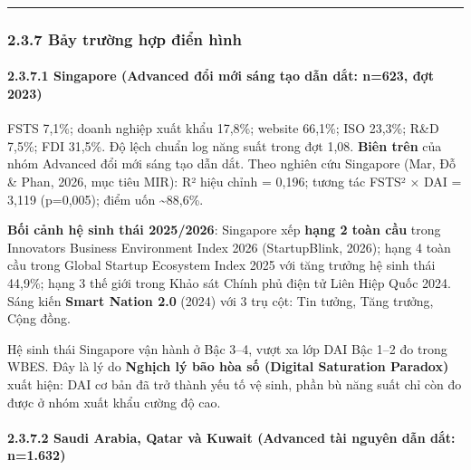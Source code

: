 \documentclass[
  a4paper,
  13pt]{extreport}
\begin{document}
\begin{center}\rule{0.5\linewidth}{0.5pt}\end{center}

\hypertarget{bux1ea3y-trux1b0ux1eddng-hux1ee3p-ux111iux1ec3n-huxecnh}{%
\subsubsection{2.3.7 Bảy trường hợp điển
hình}\label{bux1ea3y-trux1b0ux1eddng-hux1ee3p-ux111iux1ec3n-huxecnh}}

\hypertarget{singapore-advanced-ux111ux1ed5i-mux1edbi-suxe1ng-tux1ea1o-dux1eabn-dux1eaft-n623-ux111ux1ee3t-2023}{%
\paragraph{2.3.7.1 Singapore (Advanced đổi mới sáng tạo dẫn dắt: n=623,
đợt
2023)}\label{singapore-advanced-ux111ux1ed5i-mux1edbi-suxe1ng-tux1ea1o-dux1eabn-dux1eaft-n623-ux111ux1ee3t-2023}}

FSTS 7,1\%; doanh nghiệp xuất khẩu 17,8\%; website 66,1\%; ISO 23,3\%;
R\&D 7,5\%; FDI 31,5\%. Độ lệch chuẩn log năng suất trong đợt 1,08.
\textbf{Biên trên} của nhóm Advanced đổi mới sáng tạo dẫn dắt. Theo
nghiên cứu Singapore (Mar, Đỗ \& Phan, 2026, mục tiêu MIR): R² hiệu
chỉnh = 0,196; tương tác FSTS² × DAI = 3,119 (p=0,005); điểm uốn
\textasciitilde88,6\%.

\textbf{Bối cảnh hệ sinh thái 2025/2026}: Singapore xếp \textbf{hạng 2
toàn cầu} trong Innovators Business Environment Index 2026
(StartupBlink, 2026); hạng 4 toàn cầu trong Global Startup Ecosystem
Index 2025 với tăng trưởng hệ sinh thái 44,9\%; hạng 3 thế giới trong
Khảo sát Chính phủ điện tử Liên Hiệp Quốc 2024. Sáng kiến \textbf{Smart
Nation 2.0} (2024) với 3 trụ cột: Tin tưởng, Tăng trưởng, Cộng đồng.

Hệ sinh thái Singapore vận hành ở Bậc 3--4, vượt xa lớp DAI Bậc 1--2 đo
trong WBES. Đây là lý do \textbf{Nghịch lý bão hòa số (Digital
Saturation Paradox)} xuất hiện: DAI cơ bản đã trở thành yếu tố vệ sinh,
phần bù năng suất chỉ còn đo được ở nhóm xuất khẩu cường độ cao.

\hypertarget{saudi-arabia-qatar-vuxe0-kuwait-advanced-tuxe0i-nguyuxean-dux1eabn-dux1eaft-n1.632}{%
\paragraph{2.3.7.2 Saudi Arabia, Qatar và Kuwait (Advanced tài nguyên
dẫn dắt:
n=1.632)}\label{saudi-arabia-qatar-vuxe0-kuwait-advanced-tuxe0i-nguyuxean-dux1eabn-dux1eaft-n1.632}}
\end{document}
